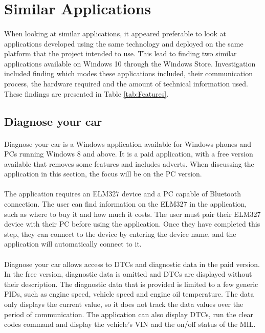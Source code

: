 \section{Similar Applications}
	\paragraph{}{
	When looking at similar applications, it appeared preferable to look at applications developed using the same technology and deployed on the same platform that the project intended to use. This lead to finding two similar applications available on Windows 10 through the Windows Store. Investigation included finding which modes these applications included, their communication process, the hardware required and the amount of technical information used. These findings are presented in Table \ref{tab:Features}.
	}
	
	
	
	\subsection{Diagnose your car}
		\paragraph{}{
		Diagnose your car is a Windows application available for Windows phones and PCs running Windows 8 and above. It is a paid application, with a free version available that removes some features and includes adverts. When discussing the application in this section, the focus will be on the PC version.
		}
		\paragraph{}{
		The application requires an ELM327 device and a PC capable of Bluetooth connection. The user can find information on the ELM327 in the application, such as where to buy it and how much it costs. The user must pair their ELM327 device with their PC before using the application. Once they have completed this step, they can connect to the device by entering the device name, and the application will automatically connect to it.
		}
		\paragraph{}{
		Diagnose your car allows access to DTCs and diagnostic data in the paid version. In the free version, diagnostic data is omitted and DTCs are displayed without their description. The diagnostic data that is provided is limited to a few generic PIDs, such as engine speed, vehicle speed and engine oil temperature. The data only displays the current value, so it does not track the data values over the period of communication. The application can also display DTCs, run the clear codes command and display the vehicle's VIN and the on/off status of the MIL.		
		}
